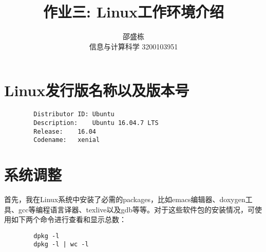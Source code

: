 \documentclass[hyperref,UTF8]{ctexart}
\title{作业三: Linux工作环境介绍}
\author{邵盛栋 \\ 信息与计算科学 3200103951}
\begin{document}
	
	\maketitle
	
	\section{Linux发行版名称以及版本号}
	\begin{verbatim}
		Distributor ID:	Ubuntu
		Description:	Ubuntu 16.04.7 LTS
		Release:	16.04
		Codename:	xenial
	\end{verbatim}
	\section{系统调整}
	首先，我在Linux系统中安装了必需的packages，比如emacs编辑器、doxygen工具、gcc等编程语言译器、texlive以及gdb等等。对于这些软件包的安装情况，可使用如下两个命令进行查看和显示总数：
	\begin{verbatim}
		dpkg -l
		dpkg -l | wc -l
	\end{verbatim}
\end{document}
